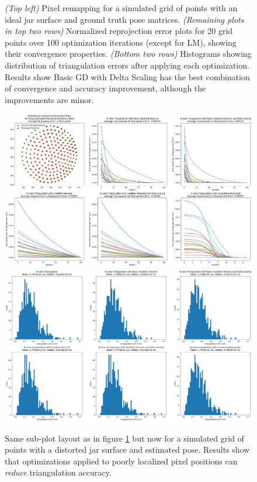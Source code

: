 \documentclass[11pt, letterpaper]{extarticle} %
\begin{document}
\begin{figure}[h]
    \caption{\textit{(Top left)} Pixel remapping for a simulated grid of points with an ideal jar surface and ground truth pose matrices. \textit{(Remaining plots in top two rows)} Normalized reprojection error plots for 20 grid points over 100 optimization iterations (except for LM), showing their convergence properties. \textit{(Bottom two rows)} Histograms showing distribution of triangulation errors after applying each optimization. Results show Basic GD with Delta Scaling has the best combination of convergence and accuracy improvement, although the improvements are minor.}
    \label{fig:optimization_charts_and_histograms_for_ideal_jar_surface_and_ground_truth_pose}
\end{figure}

\begin{figure}[h]
    \centering
    \includegraphics[width=\textwidth]{optimization_charts_for_distorted_jar_surface_and_estimated_pose.png}
    \includegraphics[width=\textwidth]{distorted_jar_surface_and_estimated_pose_triangulation_error_histograms.png}
    \caption{Same sub-plot layout as in figure \ref{fig:optimization_charts_and_histograms_for_ideal_jar_surface_and_ground_truth_pose} but now for a simulated grid of points with a distorted jar surface and estimated pose. Results show that optimizations applied to poorly localized pixel positions can \textit{reduce} triangulation accuracy.}
    \label{fig:optimization_charts_and_histograms_for_distorted_jar_surface_and_estimated_pose}
\end{figure}
\end{document}
